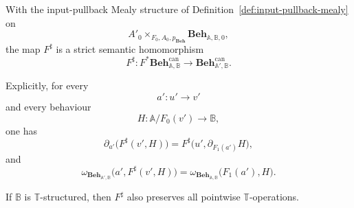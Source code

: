 \begin{lemma}
\label{lem:global-reindexing-preserves-structure}
    With the input-pullback Mealy structure of
    Definition~\ref{def:input-pullback-mealy} on
    \[
        A'_0\times_{F_0,A_0,p_{\mathbf{Beh}}}
        \mathbf{Beh}_{\mathbb A,\mathbb B,0},
    \]
    the map \(F^\sharp\) is a strict semantic homomorphism
    \[
        F^\sharp:
        F^*
        \mathbf{Beh}^{\mathrm{can}}_{\mathbb A,\mathbb B}
        \longrightarrow
        \mathbf{Beh}^{\mathrm{can}}_{\mathbb A',\mathbb B}.
    \]

    Explicitly, for every
    \[
        a':u'\to v'
    \]
    and every behaviour
    \[
        H:\mathbb A/F_0(v')\to\mathbb B,
    \]
    one has
    \[
        \partial_{a'}
        \bigl(
            F^\sharp(v',H)
        \bigr)
        =
        F^\sharp
        \bigl(
            u',
            \partial_{F_1(a')}H
        \bigr),
    \]
    and
    \[
        \omega_{\mathbf{Beh}_{\mathbb A',\mathbb B}}
        \bigl(
            a',
            F^\sharp(v',H)
        \bigr)
        =
        \omega_{\mathbf{Beh}_{\mathbb A,\mathbb B}}
        \bigl(
            F_1(a'),
            H
        \bigr).
    \]

    If \(\mathbb B\) is \(\mathbb T\)-structured, then \(F^\sharp\) also
    preserves all pointwise \(\mathbb T\)-operations.
\end{lemma}

